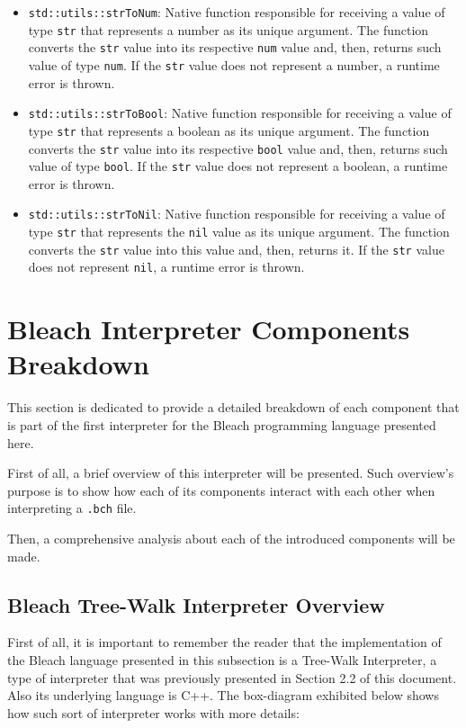 \begin{itemize}
\begin{itemize}
            \item \texttt{std::utils::strToNum}: Native function responsible for receiving a value of type \texttt{str} that represents a number as its unique argument. The function converts the \texttt{str} value into its respective \texttt{num} value and, then, returns such value of type \texttt{num}. If the \texttt{str} value does not represent a number, a runtime error is thrown.

            \item \texttt{std::utils::strToBool}: Native function responsible for receiving a value of type \texttt{str} that represents a boolean as its unique argument. The function converts the \texttt{str} value into its respective \texttt{bool} value and, then, returns such value of type \texttt{bool}. If the \texttt{str} value does not represent a boolean, a runtime error is thrown.

            \item \texttt{std::utils::strToNil}: Native function responsible for receiving a value of type \texttt{str} that represents the \texttt{nil} value as its unique argument. The function converts the \texttt{str} value into this value and, then, returns it. If the \texttt{str} value does not represent \texttt{nil}, a runtime error is thrown.
        \end{itemize}
\end{itemize}

\section{Bleach Interpreter Components Breakdown}
This section is dedicated to provide a detailed breakdown of each component that is part of the first interpreter for the Bleach programming language presented here.

First of all, a brief overview of this interpreter will be presented. Such overview's purpose is to show how each of its components interact with each other when interpreting a \texttt{.bch} file.

Then, a comprehensive analysis about each of the introduced components will be made.

\subsection{Bleach Tree-Walk Interpreter Overview}
First of all, it is important to remember the reader that the implementation of the Bleach language presented in this subsection is a Tree-Walk Interpreter, a type of interpreter that was previously presented in Section 2.2 of this document. Also its underlying language is C++. The box-diagram exhibited below shows how such sort of interpreter works with more details:

